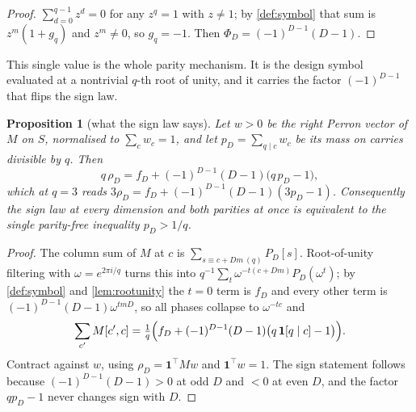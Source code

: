 \documentclass[11pt]{amsart}
\newtheorem{proposition}[theorem]{Proposition}
\theoremstyle{definition}
\theoremstyle{remark}
\begin{document}
\begin{proof}
$\sum_{d=0}^{q-1}z^d = 0$ for any $z^q = 1$ with $z \ne 1$; by \cref{def:symbol} that sum is $z^m(1 + g_q)$ and $z^m \ne 0$, so $g_q = -1$. Then $\Phi_D = (-1)^{D-1}(D-1)$.
\end{proof}

This single value is the whole parity mechanism. It is the design symbol evaluated at a nontrivial $q$-th root of unity, and it carries the factor $(-1)^{D-1}$ that flips the sign law.

\begin{proposition}[what the sign law says]
\label{prop:mass}
Let $w > 0$ be the right Perron vector of $M$ on $S$, normalised to $\sum_c w_c = 1$, and let $p_D = \sum_{q \mid c} w_c$ be its mass on carries divisible by $q$. Then
\[
  q\,\rho_D = f_D + (-1)^{D-1}(D-1)\bigl(q\,p_D - 1\bigr),
\]
which at $q = 3$ reads $3\rho_D = f_D + (-1)^{D-1}(D-1)(3p_D-1)$. Consequently the sign law at every dimension and both parities at once is equivalent to the single parity-free inequality $p_D > 1/q$.
\end{proposition}

\begin{proof}
The column sum of $M$ at $c$ is $\sum_{s \equiv c + Dm \ (q)} P_D[s]$. Root-of-unity filtering with $\omega = e^{2\pi i/q}$ turns this into $q^{-1}\sum_{t}\omega^{-t(c+Dm)}P_D(\omega^t)$; by \cref{def:symbol} and \cref{lem:rootunity} the $t = 0$ term is $f_D$ and every other term is $(-1)^{D-1}(D-1)\omega^{tmD}$, so all phases collapse to $\omega^{-tc}$ and
\[
  \sum_{c'}M[c',c] = \tfrac{1}{q}\Bigl(f_D + (-1)^{D-1}(D-1)\bigl(q\,\mathbf{1}[q\mid c] - 1\bigr)\Bigr).
\]
Contract against $w$, using $\rho_D = \mathbf 1^{\top}Mw$ and $\mathbf 1^{\top}w = 1$. The sign statement follows because $(-1)^{D-1}(D-1) > 0$ at odd $D$ and $< 0$ at even $D$, and the factor $q p_D - 1$ never changes sign with $D$.
\end{proof}
\end{document}
